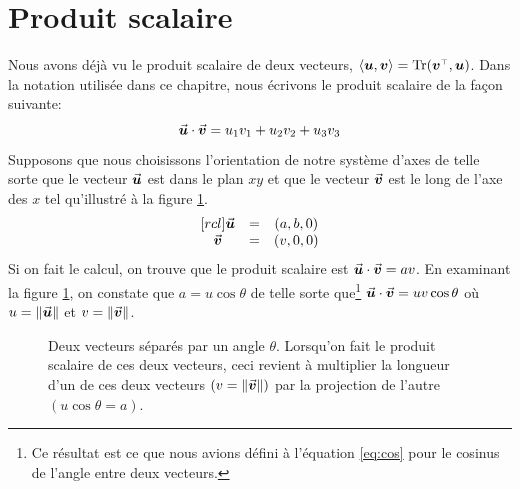 \section{Produit scalaire}
Nous avons déjà vu le produit scalaire de deux vecteurs, 
$\langle \mat{u}, \mat{v}\rangle = \tr(\transp{\mat{v}}, \mat{u})$.  
Dans la notation utilisée dans ce chapitre, nous écrivons le produit scalaire de la façon suivante:
\[
\vec{\boldsymbol{u}}\cdot\vec{\boldsymbol{v}} = u_1 v_1 + u_2 v_2 + u_3 v_3
\]
Supposons que nous choisissons l'orientation de notre système d'axes de telle sorte 
que le vecteur $\vec{\boldsymbol{u}}$ est dans le plan $xy$ et que le vecteur 
$\vec{\boldsymbol{v}}$ est le long de l'axe des $x$ tel
qu'illustré à la figure \ref{fig:dot-prod}.
\[
\begin{matrix}[rcl]
\vec{\boldsymbol{u}} &=& (a, b, 0) \\
\vec{\boldsymbol{v}} &=& (v, 0, 0)
\end{matrix}
\]
Si on fait le calcul, on trouve que le produit scalaire est $\vec{\boldsymbol{u}}\cdot\vec{\boldsymbol{v}} = av$.  
En examinant la figure  \ref{fig:dot-prod}, on constate que $a = u\cos\theta$ de telle sorte
que\footnote{Ce résultat est ce que nous avions défini à l'équation \eqref{eq:cos} pour
le cosinus de l'angle entre deux vecteurs.} $\vec{\boldsymbol{u}}\cdot\vec{\boldsymbol{v}} = uv\cos\theta$ 
où $u=\lVert\vec{\boldsymbol{u}}\rVert$ et $v=\lVert\vec{\boldsymbol{v}}\rVert$.

\begin{figure}[h]
\begin{center}
\caption{ \label{fig:dot-prod}Deux vecteurs séparés par un angle $\theta$. Lorsqu'on fait le produit scalaire de ces deux
vecteurs, ceci revient à multiplier la longueur d'un de ces deux vecteurs $(v = \lVert\vec{\boldsymbol{v}}\rVert)$ par la projection de l'autre $(u\cos\theta = a)$.
}
\end{center}
\end{figure}

